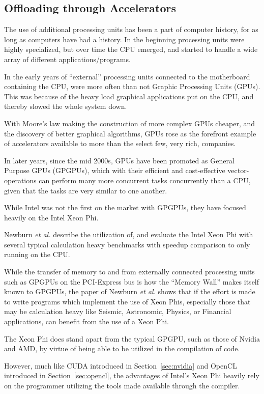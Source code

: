 \subsection{Offloading through Accelerators}

The use of additional processing units has been a part of computer history, for as long as computers have had a history.
In the beginning processing units were highly specialized, but over time the CPU emerged, and started to handle a wide array of different applications/programs.

In the early years of ``external'' processing units connected to the motherboard containing the CPU, were more often than not Graphic Processing Units (GPUs).
This was because of the heavy load graphical applications put on the CPU, and thereby slowed the whole system down.

With Moore's law making the construction of more complex GPUs cheaper, and the discovery of better graphical algorithms, GPUs rose as the forefront example of accelerators available to more than the select few, very rich, companies.

In later years, since the mid 2000s, GPUs have been promoted as General Purpose GPUs (GPGPUs), which with their efficient and cost-effective vector-operations can perform many more concurrent tasks concurrently than a CPU, given that the tasks are very similar to one another.

While Intel was not the first on the market with GPGPUs, they have focused heavily on the Intel Xeon Phi\texttrademark.

Newburn \textit{et al.}\cite{Newburn:2013:OCR:2510648.2511038} describe the utilization of, and evaluate the Intel Xeon Phi with several typical calculation heavy benchmarks with speedup comparison to only running on the CPU.

While the transfer of memory to and from externally connected processing units such as GPGPUs on the PCI-Express bus is how the ``Memory Wall'' makes itself known to GPGPUs,
the paper of Newburn \textit{et al.} shows that if the effort is made to write programs which implement the use of Xeon Phis, especially those that may be calculation heavy like Seismic, Astronomic, Physics, or Financial applications, can benefit from the use of a Xeon Phi.

The Xeon Phi does stand apart from the typical GPGPU, such as those of Nvidia and AMD, by virtue of being able to be utilized in the compilation of code.

However, much like CUDA introduced in Section~\ref{sec:nvidia} and OpenCL introduced in Section~\ref{sec:opencl}, the advantages of Intel's Xeon Phi heavily rely on the programmer utilizing the tools made available through the compiler.
